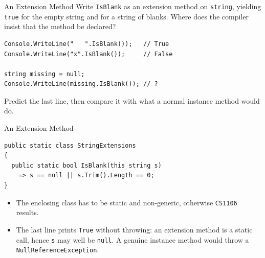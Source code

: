 \begin{exerciseframe}{An Extension Method}
  Write \texttt{IsBlank} as an extension method on \texttt{string}, yielding
  \texttt{true} for the empty string and for a string of blanks. Where does the
  compiler insist that the method be declared?
  \vspace{1ex}

  \begin{lstlisting}[basicstyle=\scriptsize\ttfamily]
Console.WriteLine("   ".IsBlank());   // True
Console.WriteLine("x".IsBlank());     // False

string missing = null;
Console.WriteLine(missing.IsBlank()); // ?
  \end{lstlisting}
  \vspace{1ex}

  Predict the last line, then compare it with what a normal instance method
  would do.
\end{exerciseframe}

\begin{solutionframe}{An Extension Method}
  \begin{lstlisting}[basicstyle=\scriptsize\ttfamily]
public static class StringExtensions
{
  public static bool IsBlank(this string s)
    => s == null || s.Trim().Length == 0;
}
  \end{lstlisting}
  \begin{itemize}
    \item The enclosing class has to be static and non-generic, otherwise
      \texttt{CS1106} results.
    \item The last line prints \texttt{True} without throwing: an extension
      method is a static call, hence \texttt{s} may well be \texttt{null}. A
      genuine instance method would throw a \texttt{NullReferenceException}.
  \end{itemize}
  \vspace{1ex}

\end{solutionframe}


